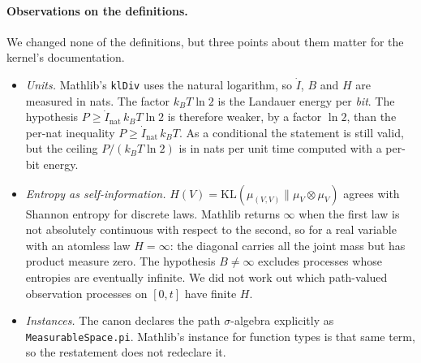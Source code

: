 \documentclass[11pt]{article}
\theoremstyle{definition}
\theoremstyle{remark}
\begin{document}
\paragraph{Observations on the definitions.} We changed none of the definitions, but three points about them matter for the
kernel's documentation.
\begin{itemize}
\item \emph{Units.} Mathlib's \texttt{klDiv} uses the natural logarithm, so $\dot I$, $B$ and $H$ are measured in nats. The factor
$k_BT\ln2$ is the Landauer energy per \emph{bit}. The hypothesis $P\ge\dot I_{\mathrm{nat}}\,k_BT\ln2$ is therefore weaker, by a
factor $\ln2$, than the per-nat inequality $P\ge \dot I_{\mathrm{nat}}\,k_BT$. As a conditional the statement is still valid,
but the ceiling $P/(k_BT\ln 2)$ is in nats per unit time computed with a per-bit energy.
\item \emph{Entropy as self-information.} $H(V)=\mathrm{KL}(\mu_{(V,V)}\|\mu_V\otimes\mu_V)$ agrees with Shannon entropy for
discrete laws. Mathlib returns $\infty$ when the first law is not absolutely continuous with respect to the second, so for a
real variable with an atomless law $H=\infty$: the diagonal carries all the joint mass but has product measure zero. The
hypothesis $B\ne\infty$ excludes processes whose entropies are eventually infinite. We did not work out which path-valued
observation processes on $[0,t]$ have finite $H$.
\item \emph{Instances.} The canon declares the path $\sigma$-algebra explicitly as \texttt{MeasurableSpace.pi}. Mathlib's
instance for function types is that same term, so the restatement does not redeclare it.
\end{itemize}
\end{document}

